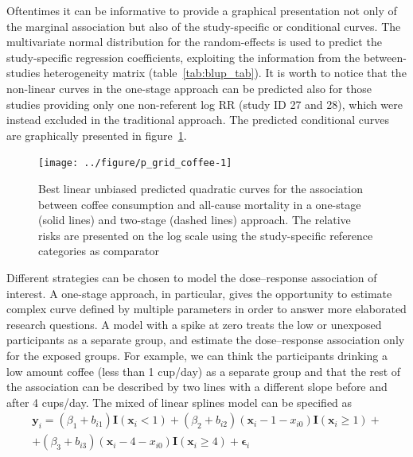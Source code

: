 \documentclass[11pt,a4paper,twoside,openany]{book}\usepackage{knitr}
\begin{document}
{Oftentimes it can be informative to provide a graphical presentation not only of the marginal association but also of the study-specific or conditional curves. The multivariate normal distribution for the random-effects is used to predict the study-specific regression coefficients, exploiting the information from the between-studies heterogeneity matrix (table~\ref{tab:blup_tab}). 
It is worth to notice that the non-linear curves in the one-stage approach can be predicted also for those studies providing only one non-referent log RR (study ID 27 and 28), which were instead excluded in the traditional approach. The predicted conditional curves are graphically presented in figure~\ref{fig:p_grid_coffee}.

\begin{knitrout}\footnotesize
{}\color{fgcolor}\begin{figure}[ht!]

{\centering \texttt{[image: ../figure/p\_grid\_coffee-1]} 

}

\caption[Best linear unbiased predicted quadratic curves for the association between coffee consumption and all-cause mortality in a one-stage (solid lines) and two-stage (dashed lines) approach]{Best linear unbiased predicted quadratic curves for the association between coffee consumption and all-cause mortality in a one-stage (solid lines) and two-stage (dashed lines) approach. The relative risks are presented on the log scale using the study-specific reference categories as comparator}\label{fig:p_grid_coffee}
\end{figure}


\end{knitrout}



Different strategies can be chosen to model the dose--response association of interest. A one-stage approach, in particular, gives the opportunity to estimate complex curve defined by multiple parameters in order to answer more elaborated research questions. A model with a spike at zero treats the low or unexposed participants as a separate group, and estimate the dose--response association only for the exposed groups. For example, we can think the participants drinking a low amount coffee (less than 1 cup/day) as a separate group and that the rest of the association can be described by two lines with a different slope before and after 4 cups/day. The mixed of linear splines model can be specified as
\begin{multline*}
\mathbf{y}_i = (\beta_1 + b_{i1}) \mathbf{I} (\mathbf{x}_{i} < 1) +(\beta_2  + b_{i2}) (\mathbf{x}_{i} - 1 - x_{i0})\mathbf{I}(\mathbf{x}_{i} \ge 1)+ \\  +(\beta_3  + b_{i3}) (\mathbf{x}_{i} - 4 - x_{i0})\mathbf{I}(\mathbf{x}_{i} \ge 4) + \boldsymbol{\epsilon}_{i}
\label{spike_zero}
\end{multline*}

}
\end{document}
